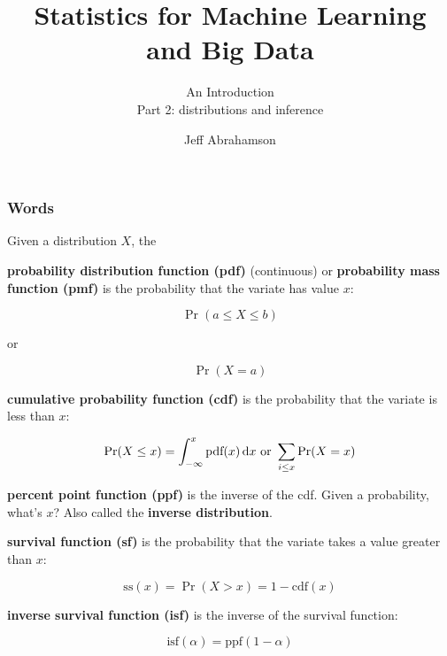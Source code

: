 

\title
{Statistics for Machine Learning and Big Data}
\subtitle{An Introduction\\[6mm] Part 2: distributions and inference}

\author[Abrahamson] {Jeff Abrahamson}




\begin{frame}
  \titlepage
\end{frame}


\begin{frame}
  \frametitle{Words}

  Given a distribution $X$, the

   {
    \textbf{probability distribution function (pdf)} (continuous) or
    \textbf{probability mass function (pmf)} is the probability that
    the variate has value $x$:
    
    \begin{displaymath}
      \Pr(a\le X \le b)
    \end{displaymath}
    \centerline{or}
    \begin{displaymath}
      \Pr(X=a)
    \end{displaymath}

  }
  
   {
    \textbf{cumulative probability function (cdf)} is the probability
    that the variate is less than $x$:

    \begin{displaymath}
      \Pr(X\le x) = \int_{-\infty}^x \text{pdf}(x) \,\mathrm{d}{x} \text{ or } \sum_{i\le x} \Pr(X = x)
    \end{displaymath}
  }
  
   {
    \textbf{percent point function (ppf)} is the inverse of the cdf.
    Given a probability, what's $x$?
    Also called the \textbf{inverse distribution}.
  }
  
   {
    \textbf{survival function (sf)} is the probability that the
    variate takes a value greater than $x$:

    \begin{displaymath}
      \text{ss}(x) = \Pr(X > x) = 1-\text{cdf}(x)
    \end{displaymath}
  }
  
   {
    \textbf{inverse survival function (isf)} is the inverse of the
    survival function:

    \begin{displaymath}
      \text{isf}(\alpha) = \text{ppf}(1-\alpha)
    \end{displaymath}
  }

\end{frame}

